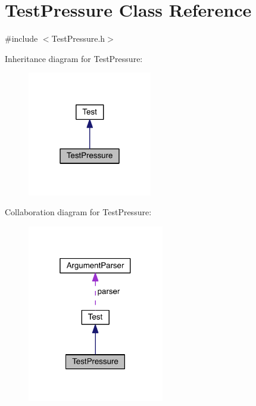 \hypertarget{class_test_pressure}{}\section{Test\+Pressure Class Reference}
\label{class_test_pressure}


{\ttfamily \#include $<$Test\+Pressure.\+h$>$}



Inheritance diagram for Test\+Pressure\+:\nopagebreak
\begin{figure}[H]
\begin{center}
\leavevmode
\includegraphics[width=154pt]{d9/dd6/class_test_pressure__inherit__graph}
\end{center}
\end{figure}


Collaboration diagram for Test\+Pressure\+:\nopagebreak
\begin{figure}[H]
\begin{center}
\leavevmode
\includegraphics[width=169pt]{d4/d75/class_test_pressure__coll__graph}
\end{center}
\end{figure}
